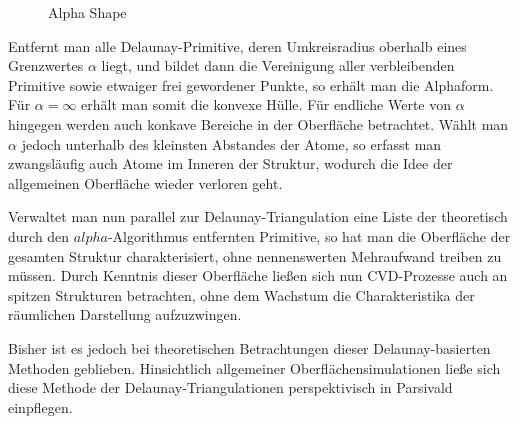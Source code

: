 \begin{figure}[bhpt]
  \centering
  \def\svgwidth{\textwidth}
  
  \caption[Alpha Shape]{Alpha Shape}
  \label{fig:delaunay-alpha}
\end{figure}

Entfernt man alle Delaunay-Primitive, deren Umkreisradius oberhalb eines Grenzwertes $\alpha$ liegt, und bildet dann die Vereinigung aller verbleibenden Primitive sowie etwaiger frei gewordener Punkte, so erhält man die Alphaform.
Für $\alpha = \infty$ erhält man somit die konvexe Hülle.
Für endliche Werte von $\alpha$ hingegen werden auch konkave Bereiche in der Oberfläche betrachtet.
Wählt man $\alpha$ jedoch unterhalb des kleinsten Abstandes der Atome, so erfasst man zwangsläufig auch Atome im Inneren der Struktur, wodurch die Idee der allgemeinen Oberfläche wieder verloren geht.

Verwaltet man nun parallel zur Delaunay-Triangulation eine Liste der theoretisch durch den $alpha$-Algorithmus entfernten Primitive, so hat man die Oberfläche der gesamten Struktur charakterisiert, ohne nennenswerten Mehraufwand treiben zu müssen.
Durch Kenntnis dieser Oberfläche ließen sich nun CVD-Prozesse auch an spitzen Strukturen betrachten, ohne dem Wachstum die Charakteristika der räumlichen Darstellung aufzuzwingen.

Bisher ist es jedoch bei theoretischen Betrachtungen dieser Delaunay-basierten Methoden geblieben.
Hinsichtlich allgemeiner Oberflächensimulationen ließe sich diese Methode der Delaunay-Triangulationen perspektivisch in Parsivald einpflegen.
